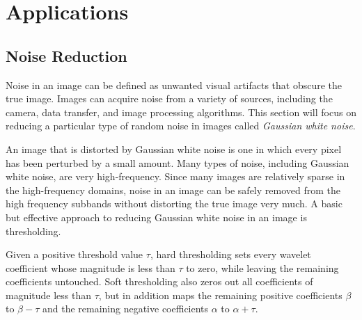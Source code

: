 \section*{Applications}

\subsection*{Noise Reduction}
Noise in an image can be defined as unwanted visual artifacts that obscure the true image.
Images can acquire noise from a variety of sources, including the camera, data transfer, and image processing algorithms.
This section will focus on reducing a particular type of random noise in images called \emph{Gaussian white noise}.


An image that is distorted by Gaussian white noise is one in which every pixel has been perturbed by a small amount. %
Many types of noise, including Gaussian white noise, are very high-frequency.
Since many images are relatively sparse in the high-frequency domains, noise in an image can be safely removed from the high frequency subbands without distorting the true image very much.
A basic but effective approach to reducing Gaussian white noise in an image is thresholding.

Given a positive threshold value $\tau$, hard thresholding sets every wavelet coefficient whose magnitude is less than $\tau$ to zero, while leaving the remaining coefficients untouched.
Soft thresholding also zeros out all coefficients of magnitude less than $\tau$, but in addition maps the remaining positive coefficients $\beta$ to $\beta - \tau$ and the remaining negative coefficients
$\alpha$ to $\alpha + \tau$.

